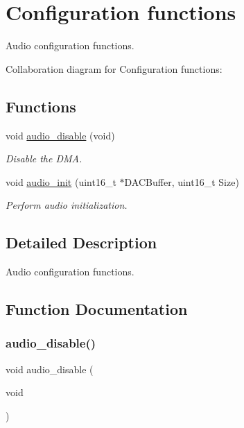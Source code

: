 \hypertarget{group___audio___init}{}\section{Configuration functions}
\label{group___audio___init}


Audio configuration functions.  


Collaboration diagram for Configuration functions\+:
\subsection*{Functions}
\begin{DoxyCompactItemize}
\item 
void \hyperlink{group___audio___init_gafff6cd7f4332d078ce0114143cd30998}{audio\+\_\+disable} (void)
\begin{DoxyCompactList}\small\item\em Disable the D\+MA. \end{DoxyCompactList}\item 
void \hyperlink{group___audio___init_gabcda20e7d4baa315d151230fcc81ec1d}{audio\+\_\+init} (uint16\+\_\+t $\ast$D\+A\+C\+Buffer, uint16\+\_\+t Size)
\begin{DoxyCompactList}\small\item\em Perform audio initialization. \end{DoxyCompactList}\end{DoxyCompactItemize}


\subsection{Detailed Description}
Audio configuration functions. 



\subsection{Function Documentation}
\mbox{\label{group___audio___init_gafff6cd7f4332d078ce0114143cd30998}} 
\subsubsection{\texorpdfstring{audio\+\_\+disable()}{audio\_disable()}}
{\footnotesize\ttfamily void audio\+\_\+disable (\begin{DoxyParamCaption}\item[{void}]{ }\end{DoxyParamCaption})}



